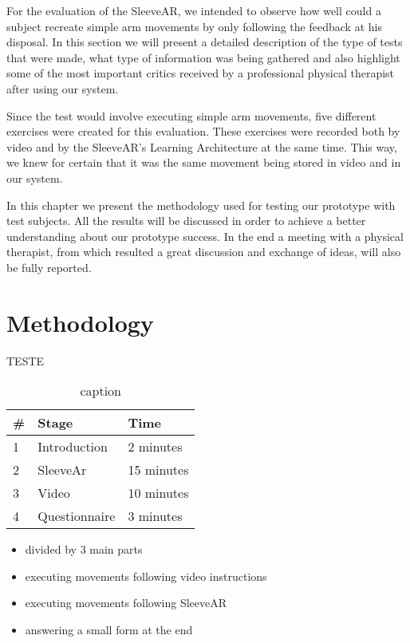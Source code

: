 For the evaluation of the SleeveAR, we intended to observe how well could a subject recreate simple arm movements by only following the feedback at his disposal. In this section we will present a detailed description of the type of tests that were made, what type of information was being gathered and also highlight some of the most important critics received by a professional physical therapist after using our system.

Since the test would involve executing simple arm movements, five different exercises were created for this evaluation.  These exercises were recorded both by video and by the SleeveAR's Learning Architecture at the same time. This way, we knew for certain that it was the same movement being stored in video and in our system.

In this chapter we present the methodology used for testing our prototype with test subjects. All the results will be discussed in order to achieve a better understanding about our prototype success. In the end a meeting with a physical therapist, from which resulted a great discussion and exchange of ideas, will also be fully reported.

\section{Methodology} \label{evaluation-methodology}
TESTE 

\begin{table}
\centering

\begin{tabular}{lll}
\#                      & Stage                              & Time                            \\ \hline
\multicolumn{1}{|l|}{1} & \multicolumn{1}{l|}{Introduction}  & \multicolumn{1}{l|}{2 minutes}  \\ \hline
\multicolumn{1}{|l|}{2} & \multicolumn{1}{l|}{SleeveAr}      & \multicolumn{1}{l|}{15 minutes} \\ \hline
\multicolumn{1}{|l|}{3} & \multicolumn{1}{l|}{Video}         & \multicolumn{1}{l|}{10 minutes} \\ \hline
\multicolumn{1}{|l|}{4} & \multicolumn{1}{l|}{Questionnaire} & \multicolumn{1}{l|}{3 minutes}  \\ \hline
\end{tabular}
\label{my-label}
\caption{caption}
\end{table}

\begin{itemize}
\item divided by 3 main parts
\item executing movements following video instructions
\item executing movements following SleeveAR
\item answering a small form at the end
\end{itemize}

